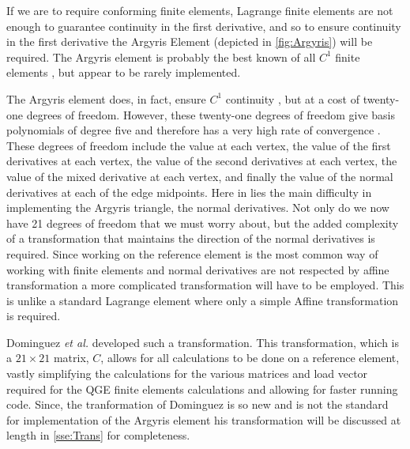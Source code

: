 If we are to require conforming finite elements, Lagrange finite elements are not enough to
guarantee continuity in the first derivative, and so to ensure continuity in the first derivative
\cite{Johnson} the Argyris Element (depicted in \autoref{fig:Argyris}) will be required. The Argyris
element is probably the best known of all $C^1$ finite elements \cite{Argyris,Dominguez08}, but
appear to be rarely implemented. 



The Argyris element does, in fact, ensure $C^1$ continuity \cite{Dominguez08,Okabe}, but at a cost
of twenty-one degrees of freedom. However, these twenty-one degrees of freedom give basis
polynomials of degree five and therefore has a very high rate of convergence \cite{Dominguez08}.
These degrees of freedom include the value at each vertex, the value of the first derivatives at
each vertex, the value of the second derivatives at each vertex, the value of the mixed derivative
at each vertex, and finally the value of the normal derivatives at each of the edge midpoints. Here
in lies the main difficulty in implementing the Argyris triangle, the normal derivatives. Not only
do we now have 21 degrees of freedom that we must worry about, but the added complexity of a
transformation that maintains the direction of the normal derivatives is required. Since working on
the reference element is the most common way of working with finite elements and normal derivatives
are not respected by affine transformation a more complicated transformation will have to be
employed. This is unlike a standard Lagrange element where only a simple Affine transformation is
required. \cite{Dominguez08}

Dominguez \emph{et al.} developed such a transformation. This transformation, which is a $21 \times
21$ matrix, $C$, allows for all calculations to be done on a reference element, vastly simplifying
the calculations for the various matrices and load vector required for the QGE finite elements
calculations and allowing for faster running code. Since, the tranformation of Dominguez is so new
and is not the standard for implementation of the Argyris element his transformation will be
discussed at length in \autoref{sse:Trans} for completeness.  
